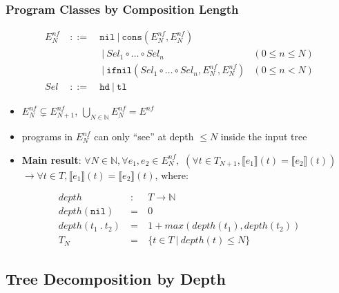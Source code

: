 \documentclass{beamer}
\begin{document}
\begin{frame}
  \frametitle{Program Classes by Composition Length}
  \[\begin{array}{lclr}
  E^{nf}_N & ~::=~ & \texttt{nil} ~|~ \texttt{cons}(E^{nf}_N, E^{nf}_N) & \\
         &       & ~|~ \mathit{Sel}_1 \circ \ldots \circ \mathit{Sel}_n & (0 \le n \le N) \\
         &       & ~|~ \texttt{ifnil}(\mathit{Sel}_1 \circ \ldots \circ \mathit{Sel}_n, E^{nf}_N, E^{nf}_N) & (0 \le n < N) \\
  \mathit{Sel} & ~::=~ & \texttt{hd} ~|~ \texttt{tl} & 
  \end{array}
  \]
  \pause
  \begin{itemize}
    \item $E^{nf}_N \varsubsetneq E^{nf}_{N+1}$, $\bigcup_{N \in \mathbb{N}} E^{nf}_N = E^{nf}$
  \pause
    \item programs in $E^{nf}_N$ can only ``see'' at depth $\le N$ inside the input tree  
  \pause
    \item \textbf{Main result}:
    $\forall N \in \mathbb{N}, \forall e_1, e_2 \in E^{nf}_N,$ 
    $(\forall t \in T_{N+1}, \llbracket e_1 \rrbracket (t) = \llbracket e_2 \rrbracket (t))$
    $\rightarrow \forall t \in T, \llbracket e_1 \rrbracket (t) = \llbracket e_2 \rrbracket (t)$, where:
  \end{itemize}
    \[\begin{array}{lcl}
    \mathit{depth} & ~:~ & T \rightarrow \mathbb{N} \\
    \mathit{depth}(\texttt{nil}) & ~=~ & 0 \\
    \mathit{depth}(t_1 ~.~ t_2) & ~=~ & 1 + \mathit{max}(\mathit{depth}(t_1), \mathit{depth}(t_2)) \\
    T_{N} & ~=~ & \{t \in T ~|~ \mathit{depth}(t) \le N \} 
    \end{array}
    \]
\end{frame}

\subsection{Tree Decomposition by Depth}
\end{document}
